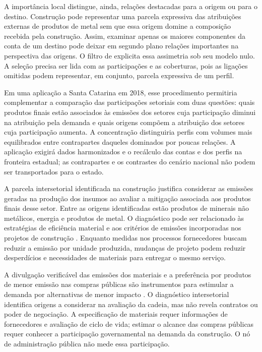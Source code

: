 \documentclass[11pt]{article}
\begin{document}
A importância local distingue, ainda, relações destacadas para a origem ou para o destino. Construção pode representar uma parcela expressiva das atribuições externas de produtos de metal sem que essa origem domine a composição recebida pela construção. Assim, examinar apenas os maiores componentes da conta de um destino pode deixar em segundo plano relações importantes na perspectiva das origens. O filtro de \textcite{serrano2009} explicita essa assimetria sob seu modelo nulo. A seleção precisa ser lida com as participações e as coberturas, pois as ligações omitidas podem representar, em conjunto, parcela expressiva de um perfil.

Em uma aplicação a Santa Catarina em 2018, esse procedimento permitiria complementar a comparação das participações setoriais com duas questões: quais produtos finais estão associados às emissões dos setores cuja participação diminui na atribuição pela demanda e quais origens compõem a atribuição dos setores cuja participação aumenta. A concentração distinguiria perfis com volumes mais equilibrados entre contrapartes daqueles dominados por poucas relações. A aplicação exigirá dados harmonizados e o recálculo das contas e dos perfis na fronteira estadual; as contrapartes e os contrastes do cenário nacional não podem ser transportados para o estado.

A parcela intersetorial identificada na construção justifica considerar as emissões geradas na produção dos insumos ao avaliar a mitigação associada aos produtos finais desse setor. Entre as origens identificadas estão produtos de minerais não metálicos, energia e produtos de metal. O diagnóstico pode ser relacionado às estratégias de eficiência material e aos critérios de emissões incorporadas nos projetos de construção \parencite[seções~5.1 e~6.4]{rissman2020}. Enquanto medidas nos processos fornecedores buscam reduzir a emissão por unidade produzida, mudanças de projeto podem reduzir desperdícios e necessidades de materiais para entregar o mesmo serviço.

A divulgação verificável das emissões dos materiais e a preferência por produtos de menor emissão nas compras públicas são instrumentos para estimular a demanda por alternativas de menor impacto \parencite[seções~6.6 e~6.7]{rissman2020}. O diagnóstico intersetorial identifica origens a considerar na avaliação da cadeia, mas não revela contratos ou poder de negociação. A especificação de materiais requer informações de fornecedores e avaliação de ciclo de vida; estimar o alcance das compras públicas requer conhecer a participação governamental na demanda da construção. O nó de administração pública não mede essa participação.
\end{document}
